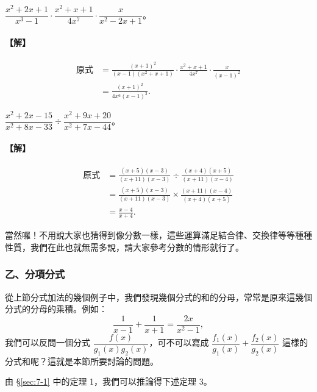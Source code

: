 \begin{example}\label{ex:7-3-3}
$\dfrac{x^2+2x+1}{x^3-1} \cdot \dfrac{x^2+x+1}{4x^7} \cdot \dfrac{x}{x^2-2x+1}$。

\paragraph{【解】}
\begin{align*}
  \text{原式} &= \frac{(x+1)^2}{(x-1)(x^2+x+1)} \cdot \frac{x^2+x+1}{4x^7} \cdot \frac{x}{(x-1)^2} \\
  &= \frac{(x+1)^2}{4x^6(x-1)^3}.
\end{align*}
\end{example}

\begin{example}\label{ex:7-3-4}
$\dfrac{x^2+2x-15}{x^2+8x-33} \div \dfrac{x^2+9x+20}{x^2+7x-44}$。

\paragraph{【解】}
\begin{align*}
  \text{原式} &= \frac{(x+5)(x-3)}{(x+11)(x-3)} \div \frac{(x+4)(x+5)}{(x+11)(x-4)} \\
  &= \frac{(x+5)(x-3)}{(x+11)(x-3)} \times \frac{(x+11)(x-4)}{(x+4)(x+5)} \\
  &= \frac{x-4}{x+4}.
\end{align*}
\end{example}

當然囉！不用說大家也猜得到像分數一樣，這些運算滿足結合律、交換律等等種種性質，我們在此也就無需多說，請大家參考分數的情形就行了。

\subsubsection*{乙、分項分式}\label{subsec:7-3-b}

從上節分式加法的幾個例子中，我們發現幾個分式的和的分母，常常是原來這幾個分式的分母的乘積。例如：
\begin{equation*}
  \frac{1}{x-1} + \frac{1}{x+1} = \frac{2x}{x^2-1},
\end{equation*}
我們可以反問一個分式 $\dfrac{f(x)}{g_1(x)g_2(x)}$，可不可以寫成 $\dfrac{f_1(x)}{g_1(x)} + \dfrac{f_2(x)}{g_2(x)}$ 這樣的分式和呢？這就是本節所要討論的問題。

由 \S\ref{sec:7-1} 中的定理 1，我們可以推論得下述定理 3。

